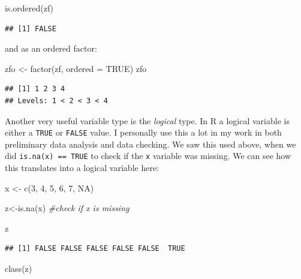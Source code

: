 \documentclass[
]{article}
\newenvironment{Shaded}{\begin{snugshade}}{\end{snugshade}}
\newcommand{\AttributeTok}[1]{\textcolor[rgb]{0.77,0.63,0.00}{#1}}
\newcommand{\CommentTok}[1]{\textcolor[rgb]{0.56,0.35,0.01}{\textit{#1}}}
\newcommand{\ConstantTok}[1]{\textcolor[rgb]{0.00,0.00,0.00}{#1}}
\newcommand{\DecValTok}[1]{\textcolor[rgb]{0.00,0.00,0.81}{#1}}
\newcommand{\FunctionTok}[1]{\textcolor[rgb]{0.00,0.00,0.00}{#1}}
\newcommand{\NormalTok}[1]{#1}
\newcommand{\OtherTok}[1]{\textcolor[rgb]{0.56,0.35,0.01}{#1}}
\begin{document}
\begin{Shaded}
\begin{Highlighting}[]
\FunctionTok{is.ordered}\NormalTok{(zf)}
\end{Highlighting}
\end{Shaded}

\begin{verbatim}
## [1] FALSE
\end{verbatim}

and as an ordered factor:

\begin{Shaded}
\begin{Highlighting}[]
\NormalTok{zfo }\OtherTok{\textless{}{-}} \FunctionTok{factor}\NormalTok{(zf, }
              \AttributeTok{ordered =} \ConstantTok{TRUE}\NormalTok{)}
\NormalTok{zfo}
\end{Highlighting}
\end{Shaded}

\begin{verbatim}
## [1] 1 2 3 4
## Levels: 1 < 2 < 3 < 4
\end{verbatim}

Another very useful variable type is the \emph{logical} type. In R a logical
variable is either a \texttt{TRUE} or \texttt{FALSE} value. I personally use this a
lot in my work in both preliminary data analysis and data checking. We
saw this used above, when we did \texttt{is.na(x)\ ==\ TRUE} to check if the \texttt{x}
variable was missing. We can see how this translates into a logical
variable here:

\begin{Shaded}
\begin{Highlighting}[]
\NormalTok{x }\OtherTok{\textless{}{-}} \FunctionTok{c}\NormalTok{(}\DecValTok{3}\NormalTok{, }\DecValTok{4}\NormalTok{, }\DecValTok{5}\NormalTok{, }\DecValTok{6}\NormalTok{, }\DecValTok{7}\NormalTok{, }\ConstantTok{NA}\NormalTok{)}

\NormalTok{z}\OtherTok{\textless{}{-}}\FunctionTok{is.na}\NormalTok{(x) }\CommentTok{\#check if x is missing}

\NormalTok{z}
\end{Highlighting}
\end{Shaded}

\begin{verbatim}
## [1] FALSE FALSE FALSE FALSE FALSE  TRUE
\end{verbatim}

\begin{Shaded}
\begin{Highlighting}[]
\FunctionTok{class}\NormalTok{(z)}
\end{Highlighting}
\end{Shaded}
\end{document}
